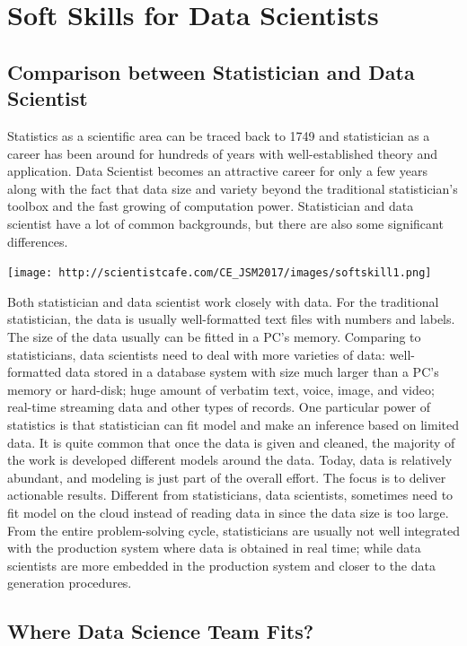 \documentclass[]{book}
\theoremstyle{definition}
\theoremstyle{definition}
\theoremstyle{remark}
\begin{document}
\chapter{Soft Skills for Data
Scientists}\label{soft-skills-for-data-scientists}

\section{Comparison between Statistician and Data
Scientist}\label{comparison-between-statistician-and-data-scientist}

Statistics as a scientific area can be traced back to 1749 and
statistician as a career has been around for hundreds of years with
well-established theory and application. Data Scientist becomes an
attractive career for only a few years along with the fact that data
size and variety beyond the traditional statistician's toolbox and the
fast growing of computation power. Statistician and data scientist have
a lot of common backgrounds, but there are also some significant
differences.

\texttt{[image: http://scientistcafe.com/CE\_JSM2017/images/softskill1.png]}

Both statistician and data scientist work closely with data. For the
traditional statistician, the data is usually well-formatted text files
with numbers and labels. The size of the data usually can be fitted in a
PC's memory. Comparing to statisticians, data scientists need to deal
with more varieties of data: well-formatted data stored in a database
system with size much larger than a PC's memory or hard-disk; huge
amount of verbatim text, voice, image, and video; real-time streaming
data and other types of records. One particular power of statistics is
that statistician can fit model and make an inference based on limited
data. It is quite common that once the data is given and cleaned, the
majority of the work is developed different models around the data.
Today, data is relatively abundant, and modeling is just part of the
overall effort. The focus is to deliver actionable results. Different
from statisticians, data scientists, sometimes need to fit model on the
cloud instead of reading data in since the data size is too large. From
the entire problem-solving cycle, statisticians are usually not well
integrated with the production system where data is obtained in real
time; while data scientists are more embedded in the production system
and closer to the data generation procedures.

\section{Where Data Science Team
Fits?}\label{where-data-science-team-fits}
\end{document}
